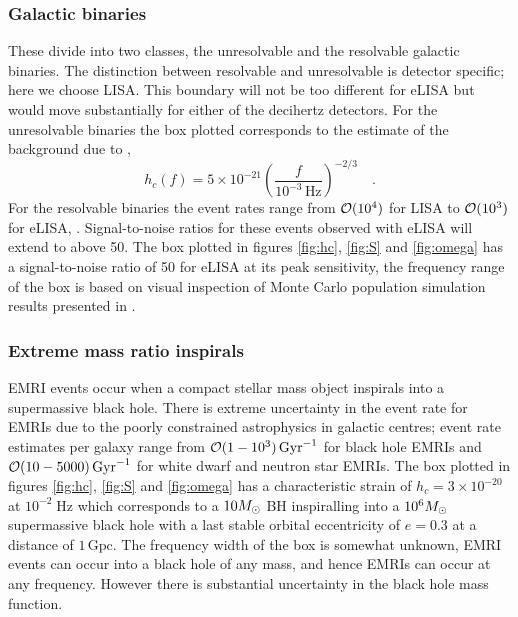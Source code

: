 \subsubsection{Galactic binaries} \label{sec:GB}
These divide into two classes, the unresolvable and the resolvable galactic binaries. The distinction between resolvable and unresolvable is detector specific; here we choose LISA. This boundary will not be too different for eLISA but would move substantially for either of the decihertz detectors. For the unresolvable binaries the box plotted corresponds to the estimate of the background due to \cite{Nelemans},
\begin{equation} h_{c}(f)= 5\times 10^{-21} \left(\frac{f}{10^{-3}\,\textrm{Hz}}\right)^{-2/3} \quad . \end{equation}
For the resolvable binaries the event rates range from ${\cal{O}}(10^{4})$ for LISA to ${\cal{O}}(10^{3})$ for eLISA, \cite{JohnsLivingReview}. Signal-to-noise ratios for these events observed with eLISA will extend to above 50. The box plotted in figures \ref{fig:hc}, \ref{fig:S} and \ref{fig:omega} has a signal-to-noise ratio of 50 for eLISA at its peak sensitivity, the frequency range of the box is based on visual inspection of Monte Carlo population simulation results presented in \cite{DoingScienceWitheLISA}.

\subsubsection{Extreme mass ratio inspirals}
EMRI events occur when a compact stellar mass object inspirals into a supermassive black hole. There is extreme uncertainty in the event rate for EMRIs due to the poorly constrained astrophysics in galactic centres; event rate estimates per galaxy range from ${\cal{O}}(1-10^{3})\,\textrm{Gyr}^{-1}$ for black hole EMRIs and ${\cal{O}}(10-5000)\,\textrm{Gyr}^{-1}$ for white dwarf and neutron star EMRIs. The box plotted in figures \ref{fig:hc}, \ref{fig:S} and \ref{fig:omega} has a characteristic strain of $h_{c}=3\times 10^{-20}$ at $10^{-2}\;\textrm{Hz}$ which corresponds to a $10M_{ \odot }$ BH inspiralling into a $10^{6}M_{ \odot }$ supermassive black hole with a last stable orbital eccentricity of $e=0.3$ at a distance of $1\,\textrm{Gpc}$. The frequency width of the box is somewhat unknown, EMRI events can occur into a black hole of any mass, and hence EMRIs can occur at any frequency. However there is substantial uncertainty in the black hole mass function.




